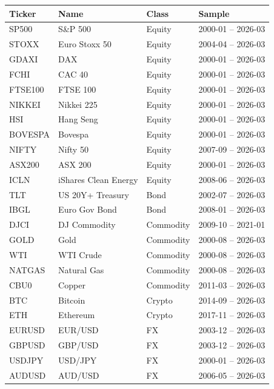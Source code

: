 \begin{tabular}{llll}
\toprule
Ticker & Name & Class & Sample \\
\midrule
  SP500 & S\&P 500 & Equity & 2000-01 -- 2026-03 \\
  STOXX & Euro Stoxx 50 & Equity & 2004-04 -- 2026-03 \\
  GDAXI & DAX & Equity & 2000-01 -- 2026-03 \\
  FCHI & CAC 40 & Equity & 2000-01 -- 2026-03 \\
  FTSE100 & FTSE 100 & Equity & 2000-01 -- 2026-03 \\
  NIKKEI & Nikkei 225 & Equity & 2000-01 -- 2026-03 \\
  HSI & Hang Seng & Equity & 2000-01 -- 2026-03 \\
  BOVESPA & Bovespa & Equity & 2000-01 -- 2026-03 \\
  NIFTY & Nifty 50 & Equity & 2007-09 -- 2026-03 \\
  ASX200 & ASX 200 & Equity & 2000-01 -- 2026-03 \\
  ICLN & iShares Clean Energy & Equity & 2008-06 -- 2026-03 \\
  TLT & US 20Y+ Treasury & Bond & 2002-07 -- 2026-03 \\
  IBGL & Euro Gov Bond & Bond & 2008-01 -- 2026-03 \\
  DJCI & DJ Commodity & Commodity & 2009-10 -- 2021-01 \\
  GOLD & Gold & Commodity & 2000-08 -- 2026-03 \\
  WTI & WTI Crude & Commodity & 2000-08 -- 2026-03 \\
  NATGAS & Natural Gas & Commodity & 2000-08 -- 2026-03 \\
  CBU0 & Copper & Commodity & 2011-03 -- 2026-03 \\
  BTC & Bitcoin & Crypto & 2014-09 -- 2026-03 \\
  ETH & Ethereum & Crypto & 2017-11 -- 2026-03 \\
  EURUSD & EUR/USD & FX & 2003-12 -- 2026-03 \\
  GBPUSD & GBP/USD & FX & 2003-12 -- 2026-03 \\
  USDJPY & USD/JPY & FX & 2000-01 -- 2026-03 \\
  AUDUSD & AUD/USD & FX & 2006-05 -- 2026-03 \\
\bottomrule
\end{tabular}